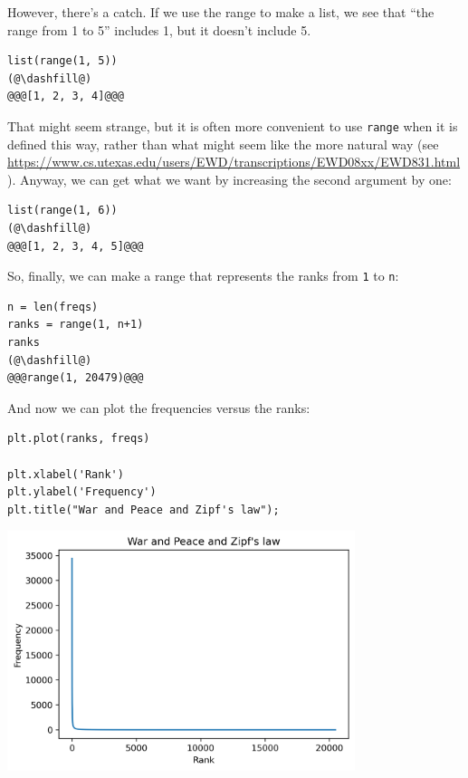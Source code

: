 However, there's a catch. If we use the range to make a list, we see
that ``the range from 1 to 5'' includes 1, but it doesn't include 5.

\begin{lstlisting}[]
list(range(1, 5))
(@\dashfill@)
@@@[1, 2, 3, 4]@@@
\end{lstlisting}

That might seem strange, but it is often more convenient to use
\passthrough{\lstinline!range!} when it is defined this way, rather than
what might seem like the more natural way (see
\url{https://www.cs.utexas.edu/users/EWD/transcriptions/EWD08xx/EWD831.html}).
Anyway, we can get what we want by increasing the second argument by
one:

\begin{lstlisting}[]
list(range(1, 6))
(@\dashfill@)
@@@[1, 2, 3, 4, 5]@@@
\end{lstlisting}

So, finally, we can make a range that represents the ranks from
\passthrough{\lstinline!1!} to \passthrough{\lstinline!n!}:

\begin{lstlisting}[]
n = len(freqs)
ranks = range(1, n+1)
ranks
(@\dashfill@)
@@@range(1, 20479)@@@
\end{lstlisting}

And now we can plot the frequencies versus the ranks:

\begin{lstlisting}[]
plt.plot(ranks, freqs)

plt.xlabel('Rank')
plt.ylabel('Frequency')
plt.title("War and Peace and Zipf's law");
\end{lstlisting}

\begin{center}
\includegraphics[width=4in]{chapters/06_plotting_files/06_plotting_74_0.png}
\end{center}

